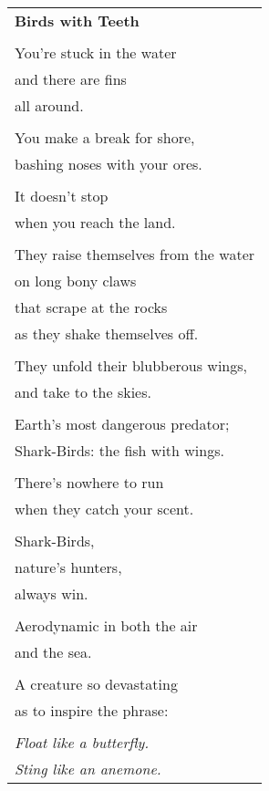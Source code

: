 \documentclass{article}
\begin{document}
\begin{center}
\begin{tabular}{l}
\textbf{Birds with Teeth} \\
\\
You're stuck in the water \\
and there are fins \\
all around. \\
\\
You make a break for shore, \\
bashing noses with your ores. \\
\\
It doesn't stop \\
when you reach the land. \\
\\
They raise themselves from the water \\
on long bony claws \\
that scrape at the rocks \\
as they shake themselves off. \\
\\
They unfold their blubberous wings, \\
and take to the skies. \\
\\
Earth's most dangerous predator; \\
Shark-Birds: the fish with wings. \\
\\
There's nowhere to run \\
when they catch your scent. \\
\\
Shark-Birds, \\
nature's hunters, \\
always win. \\
\\
Aerodynamic in both the air \\
and the sea. \\
\\
A creature so devastating \\
as to inspire the phrase: \\
\\
\textit{Float like a butterfly.} \\
\textit{Sting like an anemone.} \\
\end{tabular}
\end{center}
\end{document}
